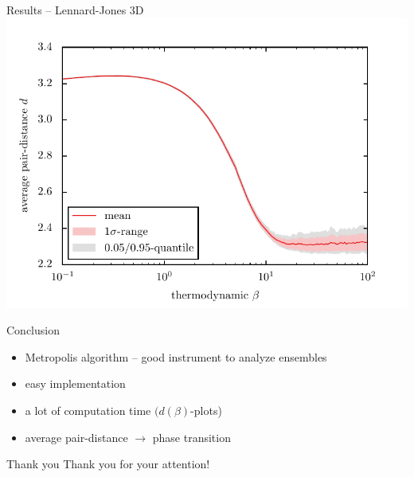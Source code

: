 \documentclass[mathserif,serif]{beamer}
\begin{document}
\begin{frame}{Results -- Lennard-Jones 3D}
	\pause
	\centering
	\includegraphics[width=\textwidth]{../report/figures/temp_dep_lennard_jones3d.pdf}
\end{frame}



\begin{frame}{Conclusion}
	\begin{itemize}
		\setlength{\itemsep}{1.5em}
		\item Metropolis algorithm -- good instrument to analyze ensembles
		\item easy implementation
		\item a lot of computation time $(d(\beta)$-plots)
		\item average pair-distance $\rightarrow$ phase transition
	\end{itemize}
\end{frame}

\begin{frame}{Thank you}
	\centering
	{\LARGE Thank you for your attention!}
\end{frame}
\end{document}
